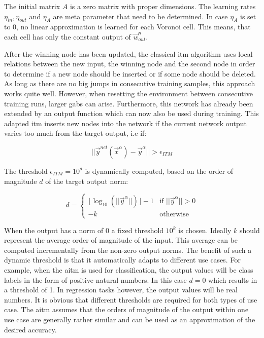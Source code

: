 The initial matrix $A$ is a zero matrix with proper dimensions. The learning rates $\eta_{in}, \eta_{out}$ and $\eta_A$ are meta parameter that need to be determined. In case $\eta_A$ is set to 0, no linear approximation is learned for each Voronoi cell. This means, that each cell has only the constant output of $\vec{w}^n_{out}$.

After the winning node has been updated, the classical \gls{itm} algorithm uses local relations between the new input, the winning node and the second node in order to determine if a new node should be inserted or if some node should be deleted. As long as there are no big jumps in consecutive training samples, this approach works quite well. However, when resetting the environment between consecutive training runs, larger gabs can arise. Furthermore, this network has already been extended by an output function which can now also be used during training. This adapted \gls{itm} inserts new nodes into the network if the current network output varies too much from the target output, i.e if:

\begin{equation}
||\vec{y}^{net}(\vec{x}^\alpha)-\vec{y}^\alpha|| > \epsilon_{ITM}
\end{equation}

The threshold $\epsilon_{ITM} = 10^d$ is dynamically computed, based on the order of magnitude $d$ of the target output norm: %

\begin{equation}
d = \begin{cases}
\lfloor\log_{10}(||\vec{y}^\alpha||)\rfloor-1 & \text{if $||\vec{y}^\alpha|| > 0$} \\
-k & \text{otherwise}
\end{cases}
\end{equation}

When the output has a norm of $0$ a fixed threshold $10^k$ is chosen. Ideally $k$ should represent the average order of magnitude of the input. This average can be computed incrementally from the non-zero output norms. The benefit of such a dynamic threshold is that it automatically adapts to different use cases. For example, when the \gls{aitm} is used for classification, the output values will be class labels in the form of positive natural numbers. In this case $d=0$ which results in a threshold of 1. In regression tasks however, the output values will be real numbers. It is obvious that different thresholds are required for both types of use case. The \gls{aitm} assumes that the orders of magnitude of the output within one use case are generally rather similar and can be used as an approximation of the desired accuracy.

